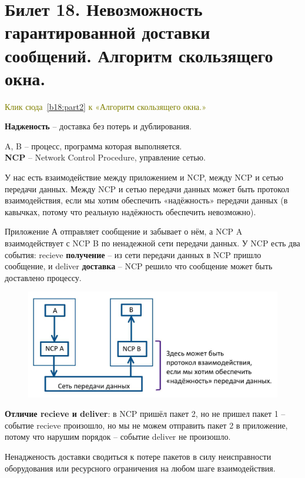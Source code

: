 \newpage
\section{Билет 18. Невозможность гарантированной доставки сообщений. Алгоритм скользящего окна.} \label{b18:part1}

\textcolor{olive}{Клик сюда~\ref{b18:part2} к «Алгоритм скользящего окна.»}

\textbf{Надженость} -- доставка без потерь и дублирования.

A, B -- процесс, программа которая выполняется.\\
\textbf{NCP} -- Network Control Procedure, управление сетью.

У нас есть взаимодействие между приложением и NCP, между NCP и сетью передачи данных.
Между NCP и сетью передачи данных может быть протокол взаимодействия, если мы хотим обеспечить «надёжность» передачи данных (в кавычках, потому что реальную надёжность обеспечить невозможно).

Приложение А отправляет сообщение и забывает о нём, а NCP A взаимодействует с NCP B по ненадежной сети передачи данных.
У NCP есть два события: recieve \textbf{получение} -- из сети передачи данных в NCP пришло сообщение, и deliver \textbf{доставка} -- NCP решило что сообщение может быть доставлено процессу.

\newline
\begin{figure}[H] \centering
	\includegraphics[scale = 0.4]{18/common.jpg}
\end{figure}

\textbf{Отличие recieve и deliver}: в NCP пришёл пакет 2, но не пришел пакет 1 -- событие recieve произошло, но мы не можем отправить пакет 2 в приложение, потому что нарушим порядок -- событие deliver не произошло.

Ненадженость доставки сводиться к потере пакетов в силу неисправности оборудования или ресурсного ограничения на любом шаге взаимодействия.
\bigskip

